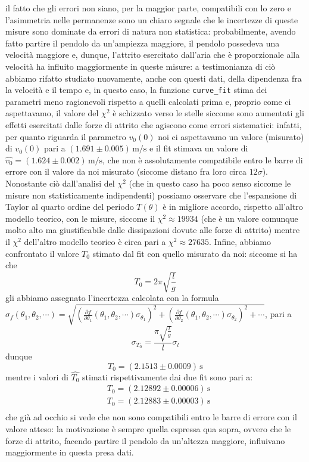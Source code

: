 \documentclass{article}
\begin{document}
\noindent il fatto che gli errori non siano, per la maggior parte, compatibili con lo zero e l'asimmetria nelle permanenze sono un chiaro segnale che le incertezze di queste misure sono dominate da errori di natura non statistica: probabilmente, avendo fatto partire il pendolo da un'ampiezza maggiore, il pendolo possedeva una velocità maggiore e, dunque, l'attrito esercitato dall'aria che è proporzionale alla velocità ha influito maggiormente in queste misure: a testimonianza di ciò abbiamo rifatto studiato nuovamente, anche con questi dati, della dipendenza fra la velocità e il tempo e, in questo caso, la funzione \texttt{curve\_fit} stima dei parametri meno ragionevoli rispetto a quelli calcolati prima e, proprio come ci aspettavamo, il valore del $\chi^2$ è schizzato verso le stelle siccome sono aumentati gli effetti esercitati dalle forze di attrito che agiscono come errori sistematici: infatti, per quanto riguarda il parametro $v_0(0)$ noi ci aspettavamo un valore (misurato) di $v_0(0)$ pari a $(1.691 \pm 0.005) \, \si{\meter\per\second}$ e il fit stimava un valore di $\hat{v_0} = (1.624 \pm 0.002) \, \si{\meter\per\second}$, che non è assolutamente compatibile entro le barre di errore con il valore da noi misurato (siccome distano fra loro circa $12\sigma$). \\
Nonostante ciò dall'analisi del $\chi^2$ (che in questo caso ha poco senso siccome le misure non statisticamente indipendenti) possiamo osservare che l'espansione di Taylor al quarto ordine del periodo $T(\theta)$ è in migliore accordo, rispetto all'altro modello teorico, con le misure, siccome il $\chi^2 \approx 19934$ (che è un valore comunque molto alto ma giustificabile dalle dissipazioni dovute alle forze di attrito) mentre il $\chi^2$ dell'altro modello teorico è circa pari a $\chi^2 \approx 27635$.
Infine, abbiamo confrontato il valore $T_0$ stimato dal fit con quello misurato da noi: siccome si ha che
$$
	T_0 = 2 \pi \sqrt{\frac{l}{g}}
$$
gli abbiamo assegnato l'incertezza calcolata con la formula $\sigma_f(\theta_1, \theta_2, \cdots) = \sqrt{\left(\frac{\partial f}{\partial \theta_1} (\theta_1, \theta_2, \cdots) \sigma_{\theta_1} \right)^2 + \left(\frac{\partial f}{\partial \theta_2} (\theta_1, \theta_2, \cdots) \sigma_{\theta_2}\right)^2 + \cdots}$, pari a
$$
	\sigma_{T_0} = \frac{\pi \sqrt{\frac{l}{g}}}{l} \sigma_l
$$
dunque
\begin{equation}
	T_0 = (2.1513 \pm 0.0009) \, \si{\second}
\end{equation}
mentre i valori di $\hat{T_0}$ stimati rispettivamente dai due fit sono pari a:
\begin{align*}
	&T_0 = (2.12892 \pm 0.00006) \, \si{\second} \\
	&T_0 = (2.12883 \pm 0.00003) \, \si{\second} \\
\end{align*}
che già ad occhio si vede che non sono compatibili entro le barre di errore con il valore atteso: la motivazione è sempre quella espressa qua sopra, ovvero che le forze di attrito, facendo partire il pendolo da un'altezza maggiore, influivano maggiormente in questa presa dati.
\end{document}
